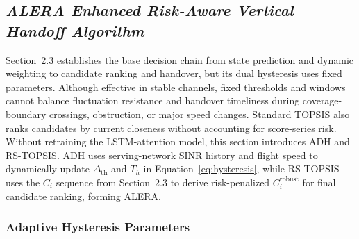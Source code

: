 \documentclass[10pt,a4paper]{article}
\begin{document}
\subsection{\textit{ALERA Enhanced Risk-Aware Vertical Handoff Algorithm}}

Section~2.3 establishes the base decision chain from state prediction and dynamic weighting to candidate ranking and handover, but its dual hysteresis uses fixed parameters. Although effective in stable channels, fixed thresholds and windows cannot balance fluctuation resistance and handover timeliness during coverage-boundary crossings, obstruction, or major speed changes. Standard TOPSIS also ranks candidates by current closeness without accounting for score-series risk. Without retraining the LSTM-attention model, this section introduces ADH and RS-TOPSIS. ADH uses serving-network SINR history and flight speed to dynamically update $\Delta_{\mathrm{th}}$ and $T_h$ in Equation~\eqref{eq:hysteresis}, while RS-TOPSIS uses the $C_i$ sequence from Section~2.3 to derive risk-penalized $C_i^{\mathrm{robust}}$ for final candidate ranking, forming ALERA.

\subsubsection{Adaptive Hysteresis Parameters}
\end{document}
